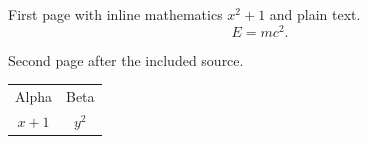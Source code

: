 \documentclass{article}
\begin{document}
First page with inline mathematics $x^2+1$ and plain text.
\begin{equation}
    E = mc^2.
\end{equation}

\newpage
Second page after the included source.
\begin{tabular}{cc}
    Alpha & Beta \\
    $x+1$ & $y^2$ \\
\end{tabular}
\end{document}
